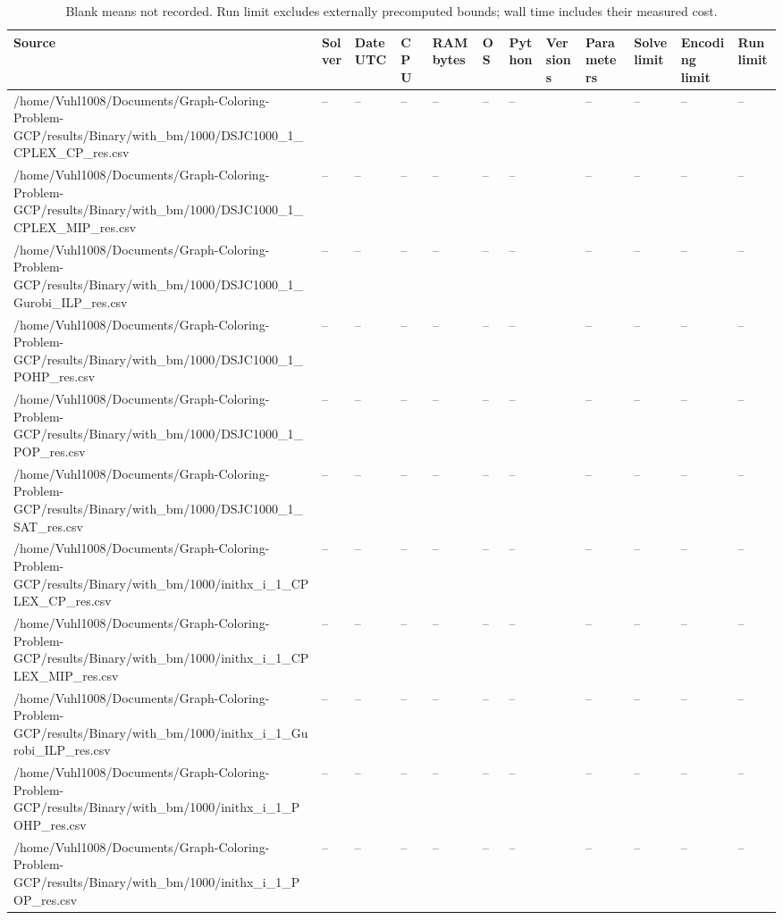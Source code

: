 \begin{table}[htbp]
\centering
\caption{Blank means not recorded. Run limit excludes externally precomputed bounds; wall time includes their measured cost.}
\label{tab:configurations}
\begin{tabular}{llllllllllll}
\hline
Source & Solver & Date UTC & CPU & RAM bytes & OS & Python & Versions & Parameters & Solve limit & Encoding limit & Run limit \\
\hline
/home/Vuhl1008/Documents/Graph-Coloring-Problem-GCP/results/Binary/with\_bm/1000/DSJC1000\_1\_CPLEX\_CP\_res.csv & -- & -- & -- & -- & -- & -- & {} & -- & -- & -- & -- \\
/home/Vuhl1008/Documents/Graph-Coloring-Problem-GCP/results/Binary/with\_bm/1000/DSJC1000\_1\_CPLEX\_MIP\_res.csv & -- & -- & -- & -- & -- & -- & {} & -- & -- & -- & -- \\
/home/Vuhl1008/Documents/Graph-Coloring-Problem-GCP/results/Binary/with\_bm/1000/DSJC1000\_1\_Gurobi\_ILP\_res.csv & -- & -- & -- & -- & -- & -- & {} & -- & -- & -- & -- \\
/home/Vuhl1008/Documents/Graph-Coloring-Problem-GCP/results/Binary/with\_bm/1000/DSJC1000\_1\_POHP\_res.csv & -- & -- & -- & -- & -- & -- & {} & -- & -- & -- & -- \\
/home/Vuhl1008/Documents/Graph-Coloring-Problem-GCP/results/Binary/with\_bm/1000/DSJC1000\_1\_POP\_res.csv & -- & -- & -- & -- & -- & -- & {} & -- & -- & -- & -- \\
/home/Vuhl1008/Documents/Graph-Coloring-Problem-GCP/results/Binary/with\_bm/1000/DSJC1000\_1\_SAT\_res.csv & -- & -- & -- & -- & -- & -- & {} & -- & -- & -- & -- \\
/home/Vuhl1008/Documents/Graph-Coloring-Problem-GCP/results/Binary/with\_bm/1000/inithx\_i\_1\_CPLEX\_CP\_res.csv & -- & -- & -- & -- & -- & -- & {} & -- & -- & -- & -- \\
/home/Vuhl1008/Documents/Graph-Coloring-Problem-GCP/results/Binary/with\_bm/1000/inithx\_i\_1\_CPLEX\_MIP\_res.csv & -- & -- & -- & -- & -- & -- & {} & -- & -- & -- & -- \\
/home/Vuhl1008/Documents/Graph-Coloring-Problem-GCP/results/Binary/with\_bm/1000/inithx\_i\_1\_Gurobi\_ILP\_res.csv & -- & -- & -- & -- & -- & -- & {} & -- & -- & -- & -- \\
/home/Vuhl1008/Documents/Graph-Coloring-Problem-GCP/results/Binary/with\_bm/1000/inithx\_i\_1\_POHP\_res.csv & -- & -- & -- & -- & -- & -- & {} & -- & -- & -- & -- \\
/home/Vuhl1008/Documents/Graph-Coloring-Problem-GCP/results/Binary/with\_bm/1000/inithx\_i\_1\_POP\_res.csv & -- & -- & -- & -- & -- & -- & {} & -- & -- & -- & -- \\

\end{tabular}
\end{table}
